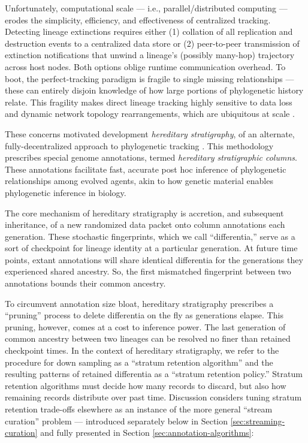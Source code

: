 Unfortunately, computational scale --- i.e., parallel/distributed computing --- erodes the simplicity, efficiency, and effectiveness of centralized tracking.
Detecting lineage extinctions requires either (1) collation of all replication and destruction events to a centralized data store or (2) peer-to-peer transmission of extinction notifications that unwind a lineage's (possibly many-hop) trajectory across host nodes.
Both options oblige runtime communication overhead.
To boot, the perfect-tracking paradigm is fragile to single missing relationships --- these can entirely disjoin knowledge of how large portions of phylogenetic history relate.
This fragility makes direct lineage tracking highly sensitive to data loss and dynamic network topology rearrangements, which are ubiquitous at scale \citep{cappello2014toward,ackley2011pursue}.

These concerns motivated development \textit{hereditary stratigraphy}, of an alternate, fully-decentralized approach to phylogenetic tracking \citep{moreno2022hereditary}.
This methodology prescribes special genome annotations, termed \textit{hereditary stratigraphic columns}.
These annotations facilitate fast, accurate post hoc inference of phylogenetic relationships among evolved agents, akin to how genetic material enables phylogenetic inference in biology.

The core mechanism of hereditary stratigraphy is accretion, and subsequent inheritance, of a new randomized data packet onto column annotations each generation.
These stochastic fingerprints, which we call ``differentia,'' serve as a sort of checkpoint for lineage identity at a particular generation.
At future time points, extant annotations will share identical differentia for the generations they experienced shared ancestry.
So, the first mismatched fingerprint between two annotations bounds their common ancestry.

To circumvent annotation size bloat, hereditary stratigraphy prescribes a ``pruning'' process to delete differentia on the fly as generations elapse.
This pruning, however, comes at a cost to inference power.
The last generation of common ancestry between two lineages can be resolved no finer than retained checkpoint times.
In the context of hereditary stratigraphy, we refer to the procedure for down sampling as a ``stratum retention algorithm'' and the resulting patterns of retained differentia as a ``stratum retention policy.''
Stratum retention algorithms must decide how many records to discard, but also how remaining records distribute over past time.
Discussion considers tuning stratum retention trade-offs elsewhere as an instance of the more general ``stream curation'' problem --- introduced separately below in Section \ref{sec:streaming-curation} and fully presented in Section \ref{sec:annotation-algorithms}:

